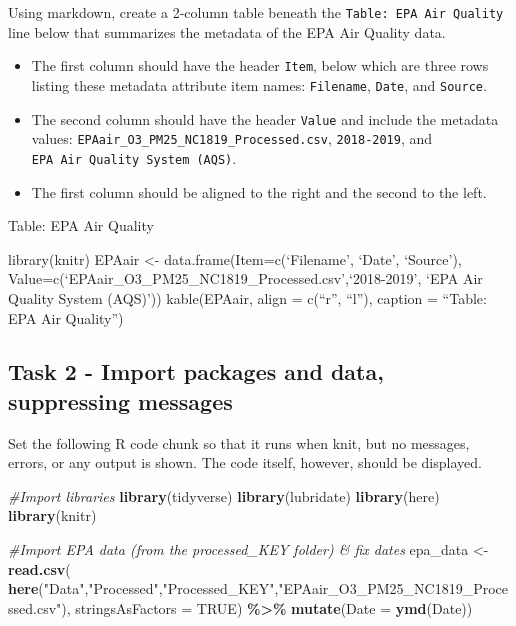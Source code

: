 \documentclass[
]{article}
\newenvironment{Shaded}{\begin{snugshade}}{\end{snugshade}}
\newcommand{\AttributeTok}[1]{\textcolor[rgb]{0.13,0.29,0.53}{#1}}
\newcommand{\CommentTok}[1]{\textcolor[rgb]{0.56,0.35,0.01}{\textit{#1}}}
\newcommand{\ConstantTok}[1]{\textcolor[rgb]{0.56,0.35,0.01}{#1}}
\newcommand{\FunctionTok}[1]{\textcolor[rgb]{0.13,0.29,0.53}{\textbf{#1}}}
\newcommand{\NormalTok}[1]{#1}
\newcommand{\OtherTok}[1]{\textcolor[rgb]{0.56,0.35,0.01}{#1}}
\newcommand{\SpecialCharTok}[1]{\textcolor[rgb]{0.81,0.36,0.00}{\textbf{#1}}}
\newcommand{\StringTok}[1]{\textcolor[rgb]{0.31,0.60,0.02}{#1}}
\begin{document}
Using markdown, create a 2-column table beneath the
\texttt{Table:\ EPA\ Air\ Quality} line below that summarizes the
metadata of the EPA Air Quality data.

\begin{itemize}
\item
  The first column should have the header \texttt{Item}, below which are
  three rows listing these metadata attribute item names:
  \texttt{Filename}, \texttt{Date}, and \texttt{Source}.
\item
  The second column should have the header \texttt{Value} and include
  the metadata values: \texttt{EPAair\_O3\_PM25\_NC1819\_Processed.csv},
  \texttt{2018-2019}, and \texttt{EPA\ Air\ Quality\ System\ (AQS)}.
\item
  The first column should be aligned to the right and the second to the
  left.
\end{itemize}

Table: EPA Air Quality

library(knitr) EPAair \textless- data.frame(Item=c(`Filename', `Date',
`Source'),
Value=c(`EPAair\_O3\_PM25\_NC1819\_Processed.csv',`2018-2019', `EPA Air
Quality System (AQS)')) kable(EPAair, align = c(``r'', ``l''), caption =
``Table: EPA Air Quality'')

\subsection{Task 2 - Import packages and data, suppressing
messages}\label{task-2---import-packages-and-data-suppressing-messages}

Set the following R code chunk so that it runs when knit, but no
messages, errors, or any output is shown. The code itself, however,
should be displayed.

\begin{Shaded}
\begin{Highlighting}[]
\CommentTok{\#Import libraries}
\FunctionTok{library}\NormalTok{(tidyverse)}
\FunctionTok{library}\NormalTok{(lubridate)}
\FunctionTok{library}\NormalTok{(here)}
\FunctionTok{library}\NormalTok{(knitr)}



\CommentTok{\#Import EPA data (from the processed\_KEY folder) \& fix dates}
\NormalTok{epa\_data }\OtherTok{\textless{}{-}} \FunctionTok{read.csv}\NormalTok{(}
  \FunctionTok{here}\NormalTok{(}\StringTok{"Data"}\NormalTok{,}\StringTok{"Processed"}\NormalTok{,}\StringTok{"Processed\_KEY"}\NormalTok{,}\StringTok{"EPAair\_O3\_PM25\_NC1819\_Processed.csv"}\NormalTok{),}
  \AttributeTok{stringsAsFactors =} \ConstantTok{TRUE}\NormalTok{) }\SpecialCharTok{\%\textgreater{}\%} 
  \FunctionTok{mutate}\NormalTok{(}\AttributeTok{Date =} \FunctionTok{ymd}\NormalTok{(Date))}
\end{Highlighting}
\end{Shaded}
\end{document}
